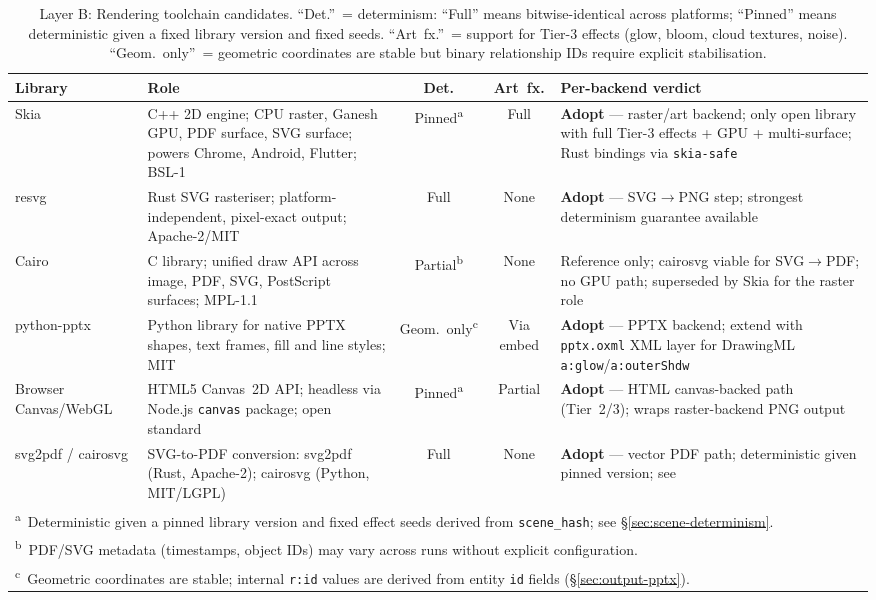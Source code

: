 \begin{table}[h]
\centering
\small
\begin{tabularx}{\textwidth}{l X c c X}
\toprule
\textbf{Library} & \textbf{Role} &
  \textbf{Det.} & \textbf{Art~fx.} & \textbf{Per-backend verdict} \\
\midrule
Skia~\cite{skia} &
  C++ 2D engine; CPU raster, Ganesh GPU, PDF surface, SVG surface;
  powers Chrome, Android, Flutter; BSL-1 &
  Pinned\textsuperscript{a} & Full &
  \textbf{Adopt} --- raster/art backend; only open library with full
  Tier-3 effects + GPU + multi-surface; Rust bindings via
  \texttt{skia-safe} \\[4pt]
resvg~\cite{resvg} &
  Rust SVG rasteriser; platform-independent, pixel-exact output;
  Apache-2/MIT &
  Full & None &
  \textbf{Adopt} --- SVG$\to$PNG step; strongest determinism
  guarantee available \\[4pt]
Cairo~\cite{cairo} &
  C library; unified draw API across image, PDF, SVG, PostScript
  surfaces; MPL-1.1 &
  Partial\textsuperscript{b} & None &
  Reference only; cairosvg viable for SVG$\to$PDF; no GPU path;
  superseded by Skia for the raster role \\[4pt]
python-pptx~\cite{python-pptx} &
  Python library for native PPTX shapes, text frames, fill and line
  styles; MIT &
  Geom.\ only\textsuperscript{c} & Via embed &
  \textbf{Adopt} --- PPTX backend; extend with \texttt{pptx.oxml}
  XML layer for DrawingML
  \texttt{a:glow}/\texttt{a:outerShdw}~\cite{ooxml} \\[4pt]
Browser Canvas/WebGL~\cite{webgl} &
  HTML5 Canvas~2D API; headless via Node.js \texttt{canvas} package;
  open standard &
  Pinned\textsuperscript{a} & Partial &
  \textbf{Adopt} --- HTML canvas-backed path (Tier~2/3); wraps
  raster-backend PNG output \\[4pt]
svg2pdf / cairosvg &
  SVG-to-PDF conversion: svg2pdf (Rust, Apache-2); cairosvg (Python,
  MIT/LGPL) &
  Full & None &
  \textbf{Adopt} --- vector PDF path; deterministic given pinned
  version; see~\cite{pdf-iso32000} \\
\bottomrule
\multicolumn{5}{l}{\textsuperscript{a}~Deterministic given a pinned library version
  and fixed effect seeds derived from \texttt{scene\_hash}; see
  \S\ref{sec:scene-determinism}.} \\
\multicolumn{5}{l}{\textsuperscript{b}~PDF/SVG metadata (timestamps, object IDs)
  may vary across runs without explicit configuration.} \\
\multicolumn{5}{l}{\textsuperscript{c}~Geometric coordinates are stable; internal
  \texttt{r:id} values are derived from entity \texttt{id} fields
  (\S\ref{sec:output-pptx}).} \\
\end{tabularx}
\caption{Layer B: Rendering toolchain candidates. ``Det.''~= determinism: ``Full''
  means bitwise-identical across platforms; ``Pinned'' means deterministic given a
  fixed library version and fixed seeds. ``Art~fx.''~= support for Tier-3 effects
  (glow, bloom, cloud textures, noise). ``Geom.\ only''~= geometric coordinates are
  stable but binary relationship IDs require explicit stabilisation.}
\label{tab:render-toolchain}
\end{table}

